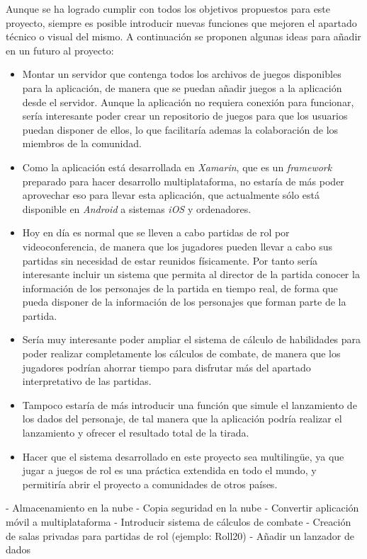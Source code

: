 
Aunque se ha logrado cumplir con todos los objetivos propuestos para este proyecto, siempre es posible introducir nuevas 
funciones que mejoren el apartado técnico o visual del mismo. A continuación se proponen algunas ideas para añadir en 
un futuro al proyecto:

\begin{itemize}
    
    \item Montar un servidor que contenga todos los archivos de juegos disponibles para la aplicación, de manera 
    que se puedan añadir juegos a la aplicación desde el servidor. Aunque la aplicación no requiera conexión para funcionar, 
    sería interesante poder crear un repositorio de juegos para que los usuarios puedan disponer de ellos, lo que facilitaría 
    ademas la colaboración de los miembros de la comunidad.

    \item Como la aplicación está desarrollada en \textit{Xamarin}, que es un \textit{framework} preparado para hacer 
    desarrollo multiplataforma, no estaría de más poder aprovechar eso para llevar esta aplicación, que actualmente sólo 
    está disponible en \textit{Android} a sistemas \textit{iOS} y ordenadores.

    \item Hoy en día es normal que se lleven a cabo partidas de rol por videoconferencia, de manera que los jugadores 
    pueden llevar a cabo sus partidas sin necesidad de estar reunidos físicamente. Por tanto sería interesante incluir 
    un sistema que permita al director de la partida conocer la información de los personajes de la partida en tiempo 
    real, de forma que pueda disponer de la información de los personajes que forman parte de la partida.

    \item Sería muy interesante poder ampliar el sistema de cálculo de habilidades para poder realizar completamente 
    los cálculos de combate, de manera que los jugadores podrían ahorrar tiempo para disfrutar más del apartado 
    interpretativo de las partidas.

    \item Tampoco estaría de más introducir una función que simule el lanzamiento de los dados del personaje, de tal 
    manera que la aplicación podría realizar el lanzamiento y ofrecer el resultado total de la tirada.

    \item Hacer que el sistema desarrollado en este proyecto sea multilingüe, ya que jugar a juegos de rol es una 
    práctica extendida en todo el mundo, y permitiría abrir el proyecto a comunidades de otros países.

\end{itemize}

- Almacenamiento en la nube
- Copia seguridad en la nube
- Convertir aplicación móvil a multiplataforma
- Introducir sistema de cálculos de combate
- Creación de salas privadas para partidas de rol (ejemplo: Roll20)
- Añadir un lanzador de dados

